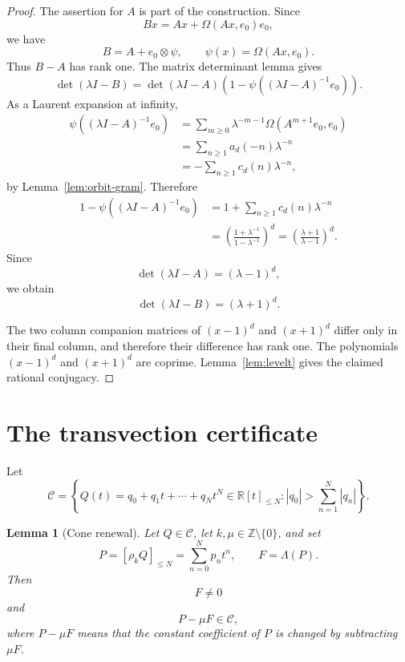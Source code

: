 \documentclass[a4paper,11pt]{amsart}
\newtheorem{lemma}[theorem]{Lemma}
\theoremstyle{remark}
\newcommand{\Z}{\mathbb Z}
\numberwithin{equation}{section}
\begin{document}
\begin{proof}
The assertion for \(A\) is part of the construction.  Since
\[
        Bx=Ax+\Omega(Ax,e_0)e_0,
\]
we have
\[
        B=A+e_0\otimes\psi,
        \qquad
        \psi(x)=\Omega(Ax,e_0).
\]
Thus \(B-A\) has rank one.  The matrix determinant lemma gives
\[
        \det(\lambda I-B)
        =
        \det(\lambda I-A)
        \left(
        1-\psi((\lambda I-A)^{-1}e_0)
        \right).
\]
As a Laurent expansion at infinity,
\[
\begin{aligned}
        \psi((\lambda I-A)^{-1}e_0)
        &=
        \sum_{m\ge0}\lambda^{-m-1}\Omega(A^{m+1}e_0,e_0) \\
        &=
        \sum_{n\ge1}a_d(-n)\lambda^{-n}                  \\
        &=
        -\sum_{n\ge1}c_d(n)\lambda^{-n},
\end{aligned}
\]
by Lemma~\ref{lem:orbit-gram}.  Therefore
\[
\begin{aligned}
        1-\psi((\lambda I-A)^{-1}e_0)
        &=
        1+\sum_{n\ge1}c_d(n)\lambda^{-n}                 \\
        &=
        \left(\frac{1+\lambda^{-1}}{1-\lambda^{-1}}\right)^d
        =
        \left(\frac{\lambda+1}{\lambda-1}\right)^d.
\end{aligned}
\]
Since
\[
        \det(\lambda I-A)=(\lambda-1)^d,
\]
we obtain
\[
        \det(\lambda I-B)=(\lambda+1)^d.
\]

The two column companion matrices of \((x-1)^d\) and \((x+1)^d\) differ only in their final column, and therefore their difference has rank one.  The polynomials \((x-1)^d\) and \((x+1)^d\) are coprime.  Lemma~\ref{lem:levelt} gives the claimed rational conjugacy.
\end{proof}

\section{The transvection certificate}

Let
\[
        \mathcal C
        =
        \left\{
        Q(t)=q_0+q_1t+\cdots+q_Nt^N\in\mathbb R[t]_{\le N}
        :
        |q_0|>\sum_{n=1}^{N}|q_n|
        \right\}.
\]

\begin{lemma}[Cone renewal]\label{lem:cone-renewal}
Let \(Q\in\mathcal C\), let \(k,\mu\in\Z\setminus\{0\}\), and set
\[
        P=[\rho_kQ]_{\le N}=\sum_{n=0}^{N}p_nt^n,
        \qquad
        F=\Lambda(P).
\]
Then
\[
        F\ne0
\]
and
\[
        P-\mu F\in\mathcal C,
\]
where \(P-\mu F\) means that the constant coefficient of \(P\) is changed by subtracting \(\mu F\).
\end{lemma}
\end{document}

